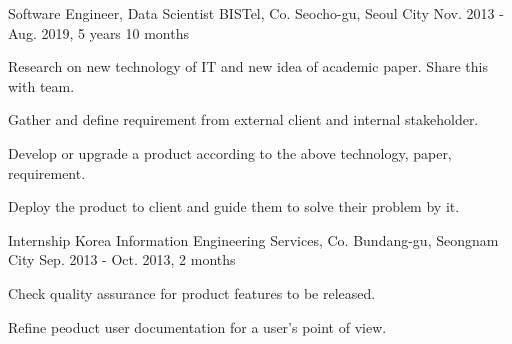

\begin{cventries}

  \cventry
    {Software Engineer, Data Scientist} %
    {BISTel, Co.} %
    {Seocho-gu, Seoul City} %
    {Nov. 2013 - Aug. 2019, 5 years 10 months} %
    {
      \begin{cvitems} %
        \item {Research on new technology of IT and new idea of academic paper. Share this with team.}
        \item {Gather and define requirement from external client and internal stakeholder.}
        \item {Develop or upgrade a product according to the above technology, paper, requirement.}
        \item {Deploy the product to client and guide them to solve their problem by it.}
      \end{cvitems}
    }

  \cventry
    {Internship} %
    {Korea Information Engineering Services, Co.} %
    {Bundang-gu, Seongnam City} %
    {Sep. 2013 - Oct. 2013, 2 months} %
    {
      \begin{cvitems} %
        \item {Check quality assurance for product features to be released.}
        \item {Refine peoduct user documentation for a user's point of view.}
      \end{cvitems}
    }

\end{cventries}
